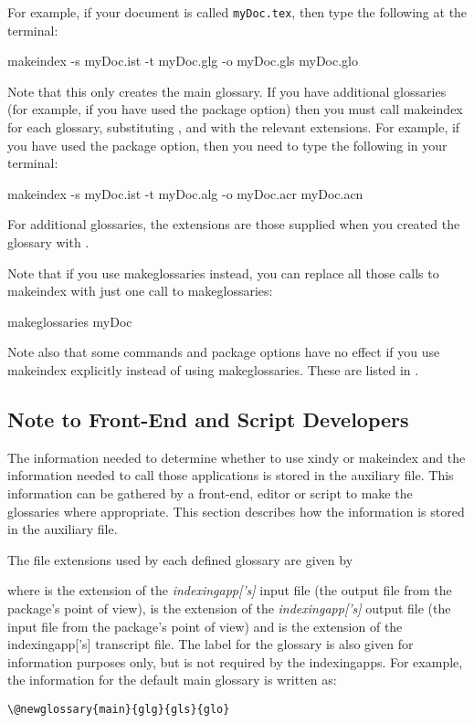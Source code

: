 \documentclass[report]{nlctdoc}
\begin{document}
For example, if your document is called \texttt{myDoc.tex}, then
type the following at the terminal:
\begin{prompt}
makeindex -s myDoc.ist -t myDoc.glg -o myDoc.gls myDoc.glo
\end{prompt}
Note that this only creates the main glossary. If you have
additional glossaries (for example, if you have used the
 package option) then you must call 
\gls{makeindex} for each glossary, substituting 
,  and  with the
relevant extensions. For example, if you have used the
 package option, then you need to type the
following in your terminal:
\begin{prompt}
makeindex -s myDoc.ist -t myDoc.alg -o myDoc.acr myDoc.acn
\end{prompt}
For additional glossaries, the extensions are those supplied
when you created the glossary with .

Note that if you use \gls{makeglossaries} instead, you can
replace all those calls to \gls{makeindex} with just one call
to \gls*{makeglossaries}:
\begin{prompt}
makeglossaries myDoc
\end{prompt}
Note also that some commands and package options have no effect if 
you use \gls*{makeindex} explicitly instead of using 
\gls{makeglossaries}. These are listed in 
.


\subsection{Note to Front-End and Script Developers}
\label{sec:notedev}

The information needed to determine whether to use \gls{xindy}
or \gls{makeindex} and the information needed to call those
applications is stored in the auxiliary file. This information can
be gathered by a front-end, editor or script to make the glossaries
where appropriate. This section describes how the information is
stored in the auxiliary file.

The file extensions used by each defined glossary are given by
\begin{definition}[\DescribeMacro{\@newglossary}]
\end{definition}
where  is the extension of the
\emph{\gls{indexingapp}['s]} input file (the output file from the
 package's point of view),  is the
extension of the \emph{\gls*{indexingapp}['s]} output file (the
input file from the  package's point of view) and
 is the extension of the \gls*{indexingapp}['s] transcript
file. The label for the glossary is also given for information
purposes only, but is not required by the \glspl*{indexingapp}. For
example, the information for the default main glossary is written
as:
\begin{verbatim}
\@newglossary{main}{glg}{gls}{glo}
\end{verbatim}
\end{document}
